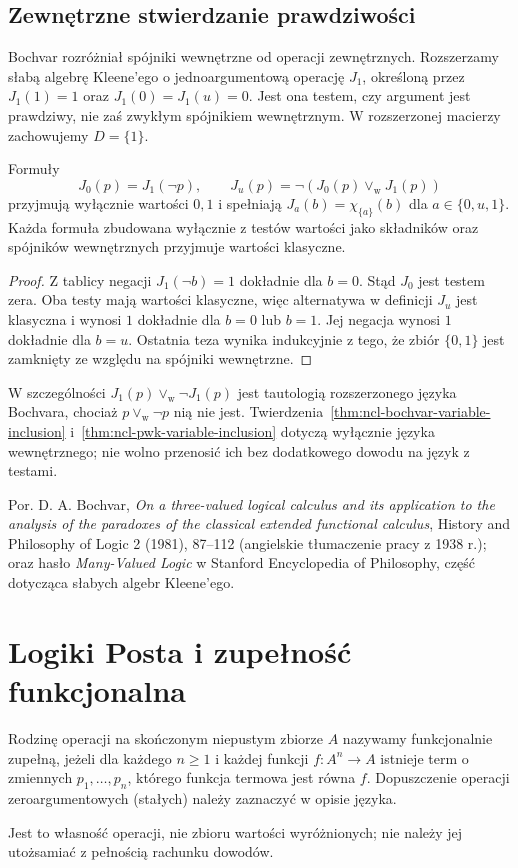 \subsection{Zewnętrzne stwierdzanie prawdziwości}
Bochvar rozróżniał spójniki wewnętrzne od operacji
zewnętrznych. Rozszerzamy słabą algebrę Kleene'ego
o jednoargumentową operację $J_1$, określoną przez
$J_1(1)=1$ oraz $J_1(0)=J_1(u)=0$.
Jest ona testem, czy argument jest prawdziwy,
nie zaś zwykłym spójnikiem wewnętrznym.
W rozszerzonej macierzy zachowujemy $D=\{1\}$.

\begin{stwierdzenie}
\label{prop:ncl-bochvar-external-tests}
Formuły
\[
 J_0(p)=J_1(\neg p),\qquad
 J_u(p)=\neg(J_0(p)\vee_{\mathrm w}J_1(p))
\]
przyjmują wyłącznie wartości $0,1$ i spełniają
$J_a(b)=\chi_{\{a\}}(b)$ dla $a\in\{0,u,1\}$.
Każda formuła zbudowana wyłącznie z testów wartości
jako składników oraz spójników wewnętrznych
przyjmuje wartości klasyczne.
\end{stwierdzenie}
\begin{proof}
Z tablicy negacji $J_1(\neg b)=1$ dokładnie dla
$b=0$. Stąd $J_0$ jest testem zera.
Oba testy mają wartości klasyczne, więc alternatywa
w definicji $J_u$ jest klasyczna i wynosi $1$
dokładnie dla $b=0$ lub $b=1$. Jej negacja wynosi
$1$ dokładnie dla $b=u$. Ostatnia teza wynika
indukcyjnie z tego, że zbiór $\{0,1\}$ jest zamknięty
ze względu na spójniki wewnętrzne.
\end{proof}
W szczególności $J_1(p)\vee_{\mathrm w}\neg J_1(p)$
jest tautologią rozszerzonego języka Bochvara,
chociaż $p\vee_{\mathrm w}\neg p$ nią nie jest.
Twierdzenia~\ref{thm:ncl-bochvar-variable-inclusion}
i~\ref{thm:ncl-pwk-variable-inclusion} dotyczą
wyłącznie języka wewnętrznego; nie wolno przenosić
ich bez dodatkowego dowodu na język z testami.

Por. D. A. Bochvar, \emph{On a three-valued logical calculus
and its application to the analysis of the paradoxes of
the classical extended functional calculus}, History and
Philosophy of Logic 2 (1981), 87--112 (angielskie tłumaczenie
pracy z 1938 r.); oraz hasło \emph{Many-Valued Logic}
w Stanford Encyclopedia of Philosophy, część dotycząca
słabych algebr Kleene'ego.

\section{Logiki Posta i zupełność funkcjonalna}

\begin{definicja}
\label{def:ncl-functional-completeness}
Rodzinę operacji na skończonym niepustym zbiorze $A$
nazywamy funkcjonalnie zupełną, jeżeli dla każdego $n\geq1$
i każdej funkcji $f:A^n\to A$ istnieje term o zmiennych
$p_1,\ldots,p_n$, którego funkcja termowa jest równa $f$.
Dopuszczenie operacji zeroargumentowych (stałych)
należy zaznaczyć w opisie języka.
\end{definicja}
Jest to własność operacji, nie zbioru wartości wyróżnionych;
nie należy jej utożsamiać z pełnością rachunku dowodów.

